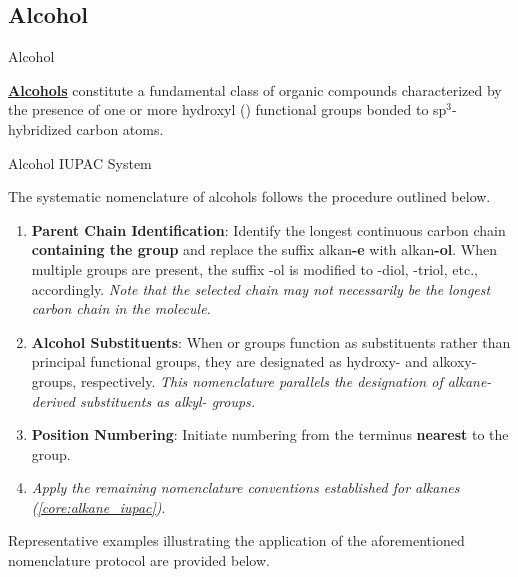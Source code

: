 \documentclass[10pt]{article}
\begin{document}
  \subsection{Alcohol}

    \begin{core}{Alcohol}

      \href{../alcohols/alcohols.pdf}{\textbf{Alcohols}} constitute a fundamental class of organic compounds characterized by the presence of one or more hydroxyl () functional groups bonded to sp$^3$-hybridized carbon atoms.

    \end{core}

    \begin{core}[label=core:alcohol_iupac]{Alcohol IUPAC System}

      The systematic nomenclature of alcohols follows the procedure outlined below.

      \begin{enumerate}[label=(\arabic*)]

        \item \textbf{Parent Chain Identification}: Identify the longest continuous carbon chain \textbf{containing the  group} and replace the suffix alkan\textbf{-e} with alkan\textbf{-ol}. When multiple  groups are present, the suffix -ol is modified to -diol, -triol, etc., accordingly. \textit{Note that the selected chain may not necessarily be the longest carbon chain in the molecule.}

        \item \textbf{Alcohol Substituents}: When  or  groups function as substituents rather than principal functional groups, they are designated as hydroxy- and alkoxy- groups, respectively. \textit{This nomenclature parallels the designation of alkane-derived substituents as alkyl- groups.}

        \item \textbf{Position Numbering}: Initiate numbering from the terminus \textbf{nearest} to the  group.

        \item \textit{Apply the remaining nomenclature conventions established for alkanes (\autoref{core:alkane_iupac})}.

      \end{enumerate}

      Representative examples illustrating the application of the aforementioned nomenclature protocol are provided below.


\end{core}
\end{document}
